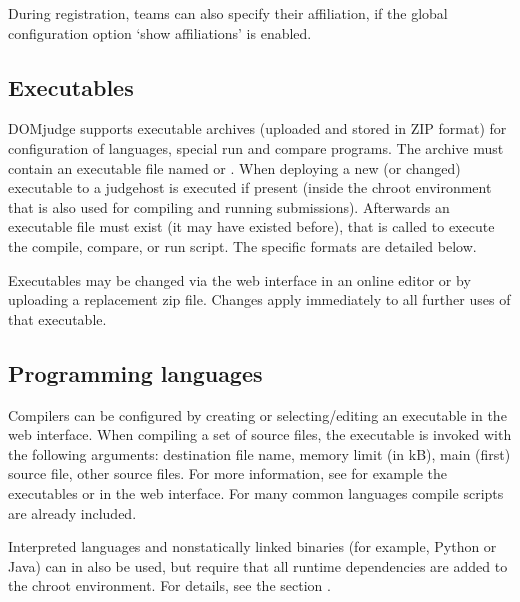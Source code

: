 \documentclass[a4paper,10pt,english,openany]{sphinxmanual}
\begin{document}
\sphinxAtStartPar
During registration, teams can also specify their affiliation,
if the global configuration option ‘show affiliations’ is enabled.


\subsection{Executables}
\label{\detokenize{config-advanced:executables}}
\sphinxAtStartPar
DOMjudge supports executable archives (uploaded and stored in ZIP
format) for configuration of languages, special run and compare
programs. The archive must contain an executable file named
 or . When deploying a new (or changed)
executable to a judgehost  is executed  if
present (inside the chroot environment that is also used for
compiling and running submissions). Afterwards an executable
file  must exist (it may have existed before), that is
called to execute the compile, compare, or run script. The
specific formats are detailed below.

\sphinxAtStartPar
Executables may be changed via the web interface in an online editor
or by uploading a replacement zip file. Changes apply immediately to
all further uses of that executable.


\subsection{Programming languages}
\label{\detokenize{config-advanced:programming-languages}}
\sphinxAtStartPar
Compilers can be configured by creating or selecting/editing an executable in
the web interface. When compiling a set of source files, the 
executable is invoked with the following arguments: destination file name,
memory limit (in kB), main (first) source file, other source files.
For more information, see for example the executables  or
 in the web interface. For many common languages
compile scripts are already included.

\sphinxAtStartPar
Interpreted languages and non\sphinxhyphen{}statically linked binaries (for example,
Python or Java) can in also be used, but require that all
runtime dependencies are added to the chroot environment. For details,
see the section {\hyperref[\detokenize{install-judgehost:make-chroot}]{}}.
\end{document}

